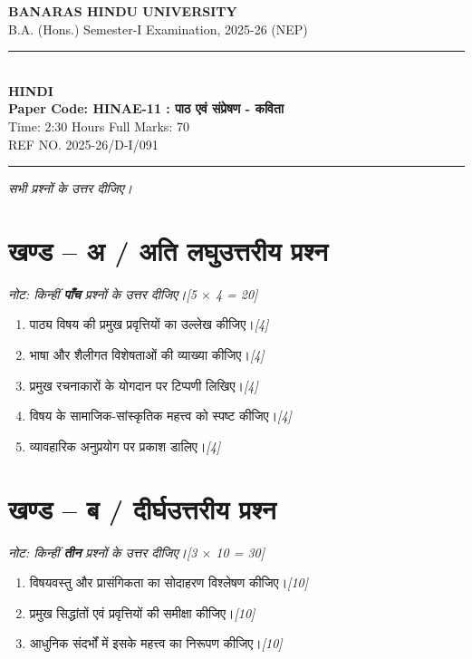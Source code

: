 \documentclass[11pt,a4paper]{article}
\newcommand{\pts}[1]{\hfill \textit{[#1]}}
\begin{document}
\begin{center}
  {\large\bfseries BANARAS HINDU UNIVERSITY}\\[2pt]
  {\normalsize B.A. (Hons.) Semester-I Examination, 2025-26 (NEP)}\\[6pt]
  \rule{0.8\linewidth}{0.5pt}\\[6pt]
  {\large\bfseries HINDI}\\[4pt]
  {\large\bfseries Paper Code: HINAE-11 : पाठ एवं संप्रेषण - कविता}\\[4pt]
  {\normalsize Time: 2:30 Hours \hfill Full Marks: 70}\\[2pt]
  {\small REF NO. 2025-26/D-I/091}
\end{center}
\rule{\linewidth}{0.4pt}
\smallskip


\noindent \textit{सभी प्रश्नों के उत्तर दीजिए।}

\bigskip

\section*{खण्ड -- अ / अति लघुउत्तरीय प्रश्न}
\noindent \textit{नोट: किन्हीं \textbf{पाँच} प्रश्नों के उत्तर दीजिए।}\pts{5 $\times$ 4 = 20}

\begin{enumerate}[label=\textbf{(\ क\ )},leftmargin=*,itemsep=6pt]
  \item[\textbf{(क)}] पाठ्य विषय की प्रमुख प्रवृत्तियों का उल्लेख कीजिए।\pts{4}
  \item[\textbf{(ख)}] भाषा और शैलीगत विशेषताओं की व्याख्या कीजिए।\pts{4}
  \item[\textbf{(ग)}] प्रमुख रचनाकारों के योगदान पर टिप्पणी लिखिए।\pts{4}
  \item[\textbf{(घ)}] विषय के सामाजिक-सांस्कृतिक महत्त्व को स्पष्ट कीजिए।\pts{4}
  \item[\textbf{(ङ)}] व्यावहारिक अनुप्रयोग पर प्रकाश डालिए।\pts{4}
\end{enumerate}

\bigskip

\section*{खण्ड -- ब / दीर्घउत्तरीय प्रश्न}
\noindent \textit{नोट: किन्हीं \textbf{तीन} प्रश्नों के उत्तर दीजिए।}\pts{3 $\times$ 10 = 30}

\begin{enumerate}[label=\textbf{\arabic*.},leftmargin=*,itemsep=12pt]
  \item विषयवस्तु और प्रासंगिकता का सोदाहरण विश्लेषण कीजिए।\pts{10}
  \item प्रमुख सिद्धांतों एवं प्रवृत्तियों की समीक्षा कीजिए।\pts{10}
  \item आधुनिक संदर्भों में इसके महत्त्व का निरूपण कीजिए।\pts{10}
\end{enumerate}
\end{document}
